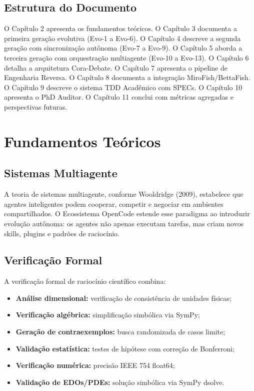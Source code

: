 \documentclass[12pt,a4paper,sumario=tradicional]{abntex2}
\begin{document}
\section{Estrutura do Documento}

O Capítulo 2 apresenta os fundamentos teóricos. O Capítulo 3 documenta a primeira geração evolutiva (Evo-1 a Evo-6). O Capítulo 4 descreve a segunda geração com sincronização autônoma (Evo-7 a Evo-9). O Capítulo 5 aborda a terceira geração com orquestração multiagente (Evo-10 a Evo-13). O Capítulo 6 detalha a arquitetura Cora-Debate. O Capítulo 7 apresenta o pipeline de Engenharia Reversa. O Capítulo 8 documenta a integração MiroFish/BettaFish. O Capítulo 9 descreve o sistema TDD Acadêmico com SPECs. O Capítulo 10 apresenta o PhD Auditor. O Capítulo 11 conclui com métricas agregadas e perspectivas futuras.

\chapter{Fundamentos Teóricos}

\section{Sistemas Multiagente}

A teoria de sistemas multiagente, conforme Wooldridge (2009), estabelece que agentes inteligentes podem cooperar, competir e negociar em ambientes compartilhados. O Ecossistema OpenCode estende esse paradigma ao introduzir evolução autônoma: os agentes não apenas executam tarefas, mas criam novos skills, plugins e padrões de raciocínio.

\section{Verificação Formal}

A verificação formal de raciocínio científico combina:
\begin{itemize}
    \item \textbf{Análise dimensional:} verificação de consistência de unidades físicas;
    \item \textbf{Verificação algébrica:} simplificação simbólica via SymPy;
    \item \textbf{Geração de contraexemplos:} busca randomizada de casos limite;
    \item \textbf{Validação estatística:} testes de hipótese com correção de Bonferroni;
    \item \textbf{Verificação numérica:} precisão IEEE 754 float64;
    \item \textbf{Validação de EDOs/PDEs:} solução simbólica via SymPy dsolve.
\end{itemize}
\end{document}
